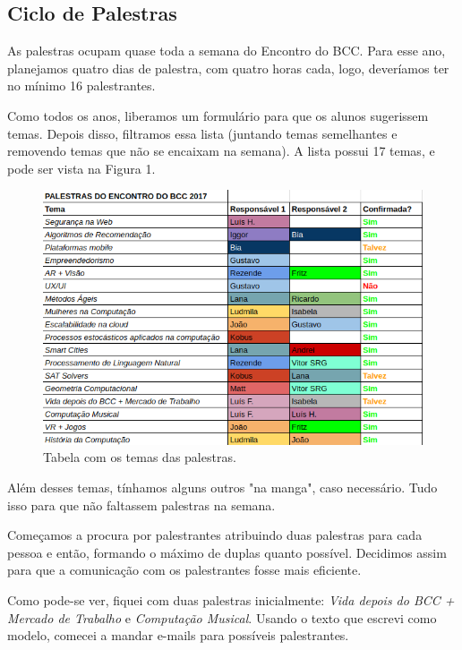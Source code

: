 \documentclass[12pt,letterpaper]{article}
\begin{document}
	\subsection{Ciclo de Palestras}
	
	As palestras ocupam quase toda a semana do Encontro do BCC. Para esse ano, planejamos quatro dias de palestra, com quatro horas cada, logo, deveríamos ter no mínimo 16 palestrantes.
	
	Como todos os anos, liberamos um formulário para que os alunos sugerissem temas. Depois disso, filtramos essa lista (juntando temas semelhantes e removendo temas que não se encaixam na semana). A lista possui 17 temas, e pode ser vista na Figura 1.
	
	\begin{figure}
		\begin{center}
			\includegraphics[scale=0.6]{palestras.png} 
			\caption{Tabela com os temas das palestras.}
		\end{center}
	\end{figure}

	Além desses temas, tínhamos alguns outros "na manga", caso necessário. Tudo isso para que não faltassem palestras na semana.
	
	Começamos a procura por palestrantes atribuindo duas palestras para cada pessoa e então, formando o máximo de duplas quanto possível. Decidimos assim para que a comunicação com os palestrantes fosse mais eficiente. 
	
	Como pode-se ver, fiquei com duas palestras inicialmente: \textit{Vida depois do BCC + Mercado de Trabalho} e \textit{Computação Musical}. Usando o texto que escrevi como modelo\cite{modelo_palestras}, comecei a mandar e-mails para possíveis palestrantes. 
	
\end{document}
